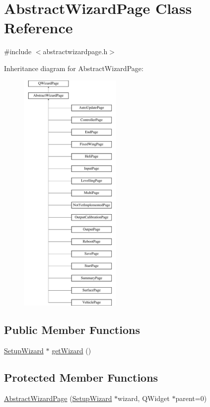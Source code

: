 \hypertarget{class_abstract_wizard_page}{\section{Abstract\-Wizard\-Page Class Reference}
\label{class_abstract_wizard_page}
}


{\ttfamily \#include $<$abstractwizardpage.\-h$>$}

Inheritance diagram for Abstract\-Wizard\-Page\-:\begin{figure}[H]
\begin{center}
\leavevmode
\includegraphics[height=12.000000cm]{class_abstract_wizard_page}
\end{center}
\end{figure}
\subsection*{Public Member Functions}
\begin{DoxyCompactItemize}
\item 
\hyperlink{class_setup_wizard}{Setup\-Wizard} $\ast$ \hyperlink{group___abstract_wizard_page_ga3b642a9ee89ee028e4f6f9a2b225abc8}{get\-Wizard} ()
\end{DoxyCompactItemize}
\subsection*{Protected Member Functions}
\begin{DoxyCompactItemize}
\item 
\hyperlink{group___abstract_wizard_page_ga3400bbb9976ac60b51a4afaff47df806}{Abstract\-Wizard\-Page} (\hyperlink{class_setup_wizard}{Setup\-Wizard} $\ast$wizard, Q\-Widget $\ast$parent=0)
\end{DoxyCompactItemize}


